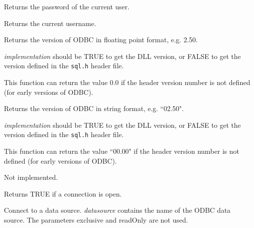 
Returns the password of the current user.



Returns the current username.



Returns the version of ODBC in floating point format, e.g. 2.50.

{\it implementation} should be TRUE to get the DLL version, or FALSE to get the
version defined in the {\tt sql.h} header file.

This function can return the value 0.0 if the header version number is not defined (for early
versions of ODBC).



Returns the version of ODBC in string format, e.g. ``02.50".

{\it implementation} should be TRUE to get the DLL version, or FALSE to get the
version defined in the {\tt sql.h} header file.

This function can return the value ``00.00" if the header version number is not defined (for early
versions of ODBC).



Not implemented.



Returns TRUE if a connection is open.

\label{wxdatabaseopen}


Connect to a data source. {\it datasource} contains the name of the ODBC data
source. The parameters exclusive and readOnly are not used.

